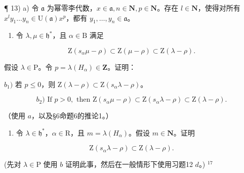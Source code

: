 ¶ 13) a) 令 \(\mathfrak{a}\) 为幂零李代数，\(x \in \mathfrak{a}, n \in \mathbf{N}, p \in \mathbf{N}\)。存在 \(l \in \mathbf{N}\)，使得对所有 \(x^{l}y_{1} \ldots y_{n} \in \mathrm{U}(\mathfrak{a})x^{p}\)，都有 \(y_{1}, \ldots, y_{n} \in \mathfrak{a}\)。

\begin{enumerate}
\def\labelenumi{\alph{enumi})}
\setcounter{enumi}{1}
\tightlist
\item
  令 \(\lambda, \mu \in \mathfrak{h}^*\)，且 \(\alpha \in \mathrm{B}\) 满足
\end{enumerate}

\[
\mathrm{Z} (s _ {\alpha} \mu - \rho) \subset \mathrm{Z} (\mu - \rho) \subset \mathrm{Z} (\lambda - \rho).
\]

假设 \(\lambda \in \mathrm{P}\)。令 \(p = \lambda (H_{\alpha})\in \mathbf{Z}\)。证明：

\(b_{1})\) 若 \(p \leq 0\)，则 \(\mathrm{Z}(\lambda - \rho) \subset \mathrm{Z}(s_{\alpha}\lambda - \rho)\)。

\[
b _ {2}) \text {   If   } p > 0, \text {   then   } \mathrm{Z} (s _ {\alpha} \mu - \rho) \subset \mathrm{Z} (s _ {\alpha} \lambda - \rho) \subset \mathrm{Z} (\lambda - \rho).
\]

（使用 \(a\)，以及§6命题6的推论1。）

\begin{enumerate}
\def\labelenumi{\alph{enumi})}
\setcounter{enumi}{2}
\tightlist
\item
  令 \(\lambda \in \mathfrak{h}^*\)，\(\alpha \in \mathrm{R}\)，且 \(m = \lambda(H_{\alpha})\)。假设 \(m \in \mathbf{N}\)。证明
\end{enumerate}

\[
\mathrm{Z} (s _ {\alpha} \lambda - \rho) \subset \mathrm{Z} (\lambda - \rho).
\]

(先对 \(\lambda \in \mathrm{P}\) 使用 \(b\) 证明此事，然后在一般情形下使用习题12 \(d\)。) \(^{17}\)

